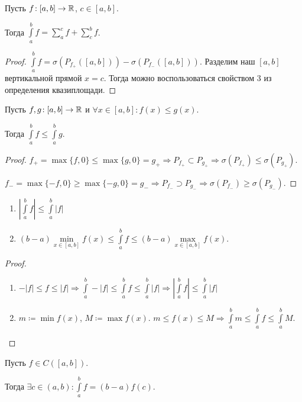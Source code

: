 \begin{theorem}
    Пусть $f\!: [a, b] \to \mathbb{R}$,  $c \in [a, b]$.

    Тогда  $\int\limits_a^b f = \sum\limits_a^c f + \sum\limits_c^b f$.
\end{theorem}
\begin{proof}
    $\int\limits_a^b f = \sigma(P_{f_+}([a, b])) - \sigma(P_{f_-}([a, b]))$. Разделим наш $[a, b]$  вертикальной прямой $x=c$. Тогда  можно воспользоваться свойством 3 из определения квазиплощади.
\end{proof}
\begin{theorem}
    Пусть $f, g\!: [a, b] \to \mathbb{R}$ и  $\forall x \in [a, b]\!: f(x) \le g(x)$.

    Тогда $\int\limits_a^b f \le \int\limits_a^b g$. 
\end{theorem}
\begin{proof}
    $f_+ = \max\{f, 0\} \le \max\{g, 0\} = g_+ \Rightarrow P_{f_+} \subset P_{g_+} \Rightarrow \sigma(P_{f_+}) \le \sigma(P_{g_+})$.

    $f_- = \max\{-f, 0\} \ge \max\{-g, 0\} = g_- \Rightarrow P_{f_-} \supset P_{g_-} \Rightarrow \sigma(P_{f_-}) \ge \sigma(P_{g_-})$.
\end{proof}
\begin{consequence}
    \begin{enumerate}
        \item $|\int\limits_a^b f| \le \int\limits_a^b |f|$ 
        \item $(b-a)\min\limits_{x \in [a, b]} f(x) \le \int\limits_a^b f \le (b-a)\max\limits_{x \in [a, b]} f(x)$.
    \end{enumerate}
\end{consequence}
\begin{proof}
    \begin{enumerate}
        \item $-|f| \le f \le |f| \Rightarrow \int\limits_a^b -|f| \le \int\limits_a^b f \le \int\limits_a^b |f| \Rightarrow |\int\limits_a^b f| \le \int\limits_a^b |f|$
        \item $m \coloneqq \min f(x)$,  $M \coloneqq \max f(x)$.  $m \le f(x) \le M \Rightarrow \int\limits_a^b m \le \int\limits_a^b f \le \int\limits_a^b M$.
    \end{enumerate}
\end{proof}
\begin{theorem}
    Пусть $f \in C([a, b])$.

    Тогда  $\exists c \in (a, b)\!: \int\limits_a^b f = (b-a)f(c)$.
\end{theorem}
